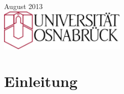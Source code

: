 \documentclass[12pt]{article}
\begin{document}
\begin{titlepage}


{\large August 2013}\\[3cm] %


\includegraphics[height=2cm]{unilogo.png}
 

\vfill %

\end{titlepage}

\tableofcontents
\newpage

\section{Einleitung}

\nocite{viebahn20}
\nocite{viebahn2011}
\nocite{iea2010}
\nocite{irena2012}
\nocite{trieb2009}
\nocite{stegen2012}
\nocite{estela2010}
\nocite{muhlenhoff2010}

\newpage

\end{document}
